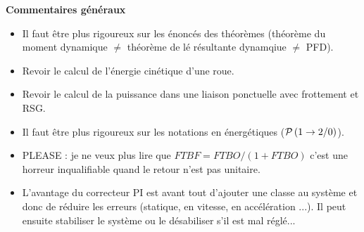 \documentclass[10pt,fleqn]{article} %
\begin{document}

\pagestyle{fancy}
\thispagestyle{plain}


\def\columnseprulecolor{\color{ocre}}
\setlength{\columnseprule}{0.4pt} 



\vspace{6cm}


\textbf{Commentaires généraux}

\begin{itemize}
\item Il faut être plus rigoureux sur les énoncés des théorèmes (théorème du moment dynamique $\neq$ théorème de lé résultante dynamqiue $\neq$ PFD).
\item Revoir le calcul de l'énergie cinétique d'une roue. 
\item Revoir le calcul de la puissance dans une liaison ponctuelle avec frottement et RSG. 
\item Il faut être plus rigoureux sur les notations en énergétiques ($\mathcal{P}\left(1\rightarrow2/0\right)$).
\item PLEASE : je ne veux plus lire que $FTBF=FTBO/(1+FTBO)$ c'est une horreur inqualifiable quand le retour n'est pas unitaire. 
\item L'avantage du correcteur PI est avant tout d'ajouter une classe au système et donc de réduire les erreurs (statique, en vitesse, en accélération ...). Il peut ensuite stabiliser le système ou le désabiliser s'il est mal réglé...
\end{itemize}
\end{document}

